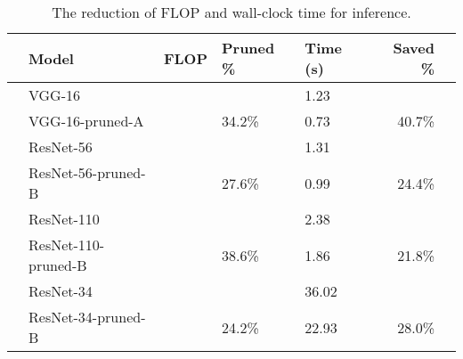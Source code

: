 \documentclass{article} \usepackage{iclr2017_conference,times}
\begin{document}
\begin{table}[htbp]
\centering
\small
\caption{The reduction of FLOP and wall-clock time for inference.}
\label{tab:wallclock_time}
\begin{tabular}{lllllrl}
\toprule
         & Model                          & FLOP                &  Pruned \%  & Time (s)  & Saved \% \\ \hline
         & VGG-16                         &   &             & 1.23      & \\
         & VGG-16-pruned-A                &   &  34.2\%     & 0.73      & 40.7\% \\ \hline
         & ResNet-56                      &   &             & 1.31      & \\         
         & ResNet-56-pruned-B             &   &  27.6\%     & 0.99      & 24.4\%\\ \hline
         & ResNet-110                     &   &             & 2.38      & \\         
         & ResNet-110-pruned-B            &   &  38.6\%     & 1.86      & 21.8\%\\ \hline      
         & ResNet-34                      &   &             & 36.02     & \\
         & ResNet-34-pruned-B             &   &  24.2\%     & 22.93     & 28.0\%\\ \bottomrule
\end{tabular}
\end{table} 
\end{document}
